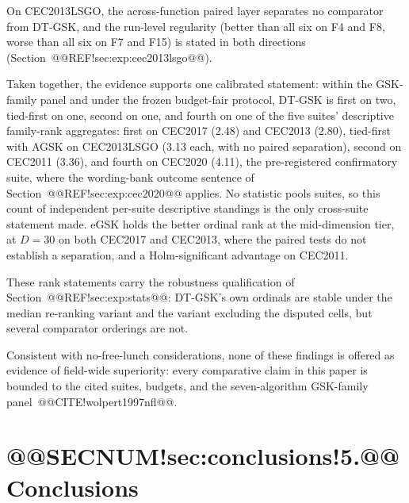 \documentclass[10pt,a4paper]{article}
\newcommand{\dtgsk}{DT-GSK}
\newcommand{\agsk}{AGSK}
\newcommand{\egsk}{eGSK}
\begin{document}
On CEC2013LSGO, the across-function paired layer separates no comparator
from \dtgsk{}, and the run-level regularity (better than all six on
F4 and F8, worse than all six on F7 and F15) is stated in both
directions (Section~@@REF!sec:exp:cec2013lsgo@@).

Taken together, the evidence supports one calibrated statement:
within the GSK-family panel and under the frozen budget-fair
protocol, \dtgsk{} is first on two, tied-first on one, second on one,
and fourth on one of the five suites' descriptive family-rank
aggregates: first on CEC2017 (2.48) and CEC2013 (2.80), tied-first
with \agsk{} on CEC2013LSGO (3.13 each, with no paired separation),
second on CEC2011 (3.36), and fourth on CEC2020 (4.11), the
pre-registered confirmatory suite, where the wording-bank outcome
sentence of Section~@@REF!sec:exp:cec2020@@ applies. No statistic pools
suites, so this count of independent per-suite descriptive standings is
the only cross-suite statement made. \egsk{} holds the better ordinal
rank at the mid-dimension tier, at $D = 30$ on both CEC2017 and CEC2013, where
the paired tests do not establish a separation, and a Holm-significant
advantage on CEC2011.

These rank statements carry the robustness qualification of
Section~@@REF!sec:exp:stats@@: \dtgsk{}'s own ordinals are stable
under the median re-ranking variant and the variant excluding the disputed cells, but
several comparator orderings are not.

Consistent with no-free-lunch considerations, none of these findings
is offered as evidence of field-wide superiority: every comparative
claim in this paper is bounded to the cited suites, budgets, and the
seven-algorithm GSK-family panel~@@CITE!wolpert1997nfl@@.

















\section{@@SECNUM!sec:conclusions!5.@@ Conclusions}\label{sec:conclusions}
\end{document}
